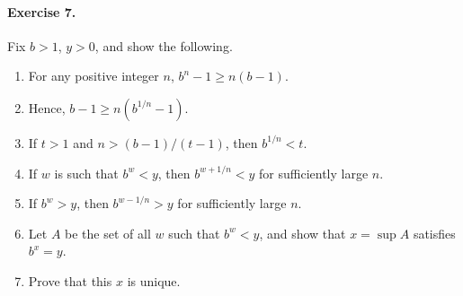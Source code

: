 \documentclass[11pt]{report}
\theoremstyle{remark}
\begin{document}
    \paragraph{Exercise 7.} Fix $b > 1$, $y > 0$, and show the following.
    \begin{enumerate}
        \itemsep0em
        \item For any positive integer $n$, $b^n - 1 \geq n(b - 1)$.
        \item Hence, $b - 1 \geq n(b^{1 / n} - 1)$.
        \item If $t > 1$ and $n > (b - 1)/(t - 1)$, then $b^{1 / n} < t$.
        \item If $w$ is such that $b^w < y$, then $b^{w + 1 / n} < y$ for
        sufficiently large $n$.
        \item If $b^w > y$, then $b^{w - 1 / n} > y$ for sufficiently large $n$.
        \item Let $A$ be the set of all $w$ such that $b^w < y$, and show that $x =
        \sup A$ satisfies $b^x = y$.
        \item Prove that this $x$ is unique.
    \end{enumerate}
\end{document}
